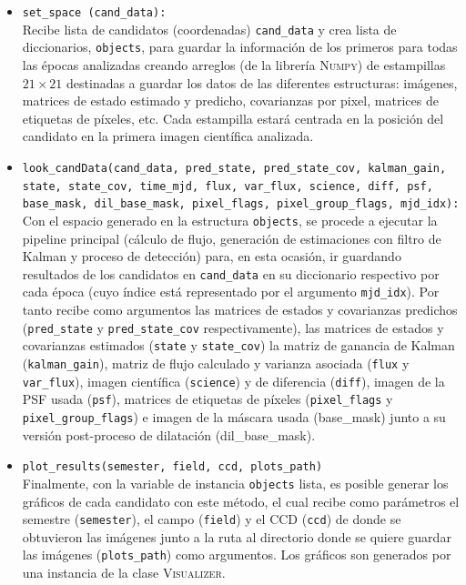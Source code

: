 \begin{itemize}
\item \texttt{set\_space (cand\_data):}\\
Recibe lista de candidatos (coordenadas) \texttt{cand\_data} y crea lista de diccionarios, \texttt{objects}, para guardar la informaci\'on de los primeros para todas las \'epocas analizadas creando arreglos (de la librer\'ia \textsc{Numpy}) de estampillas $21 \times 21$ destinadas a guardar los datos de las diferentes estructuras: im\'agenes, matrices de estado estimado y predicho, covarianzas por pixel, matrices de etiquetas de p\'ixeles, etc. Cada estampilla estar\'a centrada en la posici\'on del candidato en la primera imagen cient\'ifica analizada. 
\bigskip

\item \texttt{look\_candData(cand\_data, pred\_state, pred\_state\_cov, kalman\_gain, state, state\_cov, time\_mjd, flux, var\_flux, science, diff, psf, base\_mask, dil\_base\_mask, pixel\_flags, pixel\_group\_flags, mjd\_idx):}\\

Con el espacio generado en la estructura \texttt{objects}, se procede a ejecutar la pipeline principal (c\'alculo de flujo, generaci\'on de estimaciones con filtro de Kalman y proceso de detecci\'on) para, en esta ocasi\'on, ir guardando resultados de los candidatos en \texttt{cand\_data} en su diccionario respectivo por cada \'epoca (cuyo \'indice est\'a representado por el argumento \texttt{mjd\_idx}). Por tanto recibe como argumentos las matrices de estados y covarianzas predichos (\texttt{pred\_state} y \texttt{pred\_state\_cov} respectivamente), las matrices de estados y covarianzas estimados (\texttt{state} y \texttt{state\_cov}) la matriz de ganancia de Kalman (\texttt{kalman\_gain}), matriz de flujo calculado y varianza asociada (\texttt{flux} y \texttt{var\_flux}), imagen cient\'ifica (\texttt{science}) y de diferencia (\texttt{diff}), imagen de la PSF usada (\texttt{psf}), matrices de etiquetas de p\'ixeles (\texttt{pixel\_flags} y \texttt{pixel\_group\_flags}) e imagen de la m\'ascara usada (base\_mask) junto a su versi\'on post-proceso de dilataci\'on (dil\_base\_mask).


\item \texttt{plot\_results(semester, field, ccd, plots\_path)}\\
Finalmente, con la variable de instancia \texttt{objects} lista, es posible generar los gr\'aficos de cada candidato con este m\'etodo, el cual recibe como par\'ametros el semestre (\texttt{semester}), el campo (\texttt{field}) y el CCD (\texttt{ccd}) de donde se obtuvieron las im\'agenes junto a la ruta al directorio donde se quiere guardar las im\'agenes (\texttt{plots\_path}) como argumentos. Los gr\'aficos son generados por una instancia de la clase \textsc{Visualizer}.
\end{itemize}

